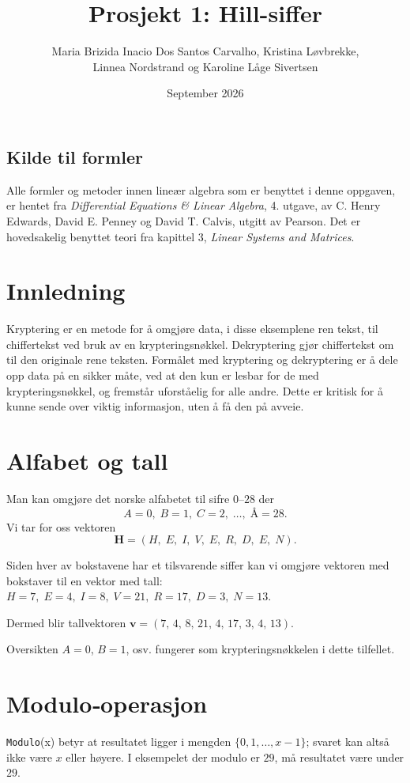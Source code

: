 \documentclass[12pt,a4paper]{article}
\title{Prosjekt 1: Hill-siffer}
\author{ Maria Brizida Inacio Dos Santos Carvalho, 
Kristina Løvbrekke, \\
Linnea Nordstrand og Karoline Låge Sivertsen }
\date{September 2026}
\begin{document}
 
\maketitle 
\tableofcontents 
\newpage


\subsection*{Kilde til formler} Alle formler og metoder innen lineær algebra som er benyttet i denne oppgaven, er hentet fra \textit{Differential Equations \& Linear Algebra}, 4. utgave, av C. Henry Edwards, David E. Penney og David T. Calvis, utgitt av Pearson. Det er hovedsakelig benyttet teori fra kapittel 3, \textit{Linear Systems and Matrices}.

\section{Innledning}
Kryptering er en metode for å omgjøre data, i disse eksemplene ren tekst,
til chiffertekst ved bruk av en krypteringsnøkkel. Dekryptering gjør
chiffertekst om til den originale rene teksten. Formålet med kryptering og
dekryptering er å dele opp data på en sikker måte, ved at den kun er lesbar
for de med krypteringsnøkkel, og fremstår uforståelig for alle andre.
Dette er kritisk for å kunne sende over viktig informasjon, uten å få den
på avveie.

\section{Alfabet og tall}
Man kan omgjøre det norske alfabetet til sifre $0$–$28$ der
\[ A=0,\; B=1,\; C=2,\;\dots,\; \text{Å}=28. \]
Vi tar for oss vektoren
\[ \mathbf{H}=(H,\;E,\;I,\;V,\;E,\;R,\;D,\;E,\;N). \]

Siden hver av bokstavene har et tilsvarende siffer kan vi omgjøre vektoren
med bokstaver til en vektor med tall:
$
H=7,\;E=4,\;I=8,\;V=21,\;R=17,\;D=3,\;N=13 .
$

Dermed blir tallvektoren
$
\mathbf{v} = (7,\,4,\,8,\,21,\,4,\,17,\,3,\,4,\,13).
$

\noindent Oversikten $A=0$, $B=1$, osv. fungerer som krypteringsnøkkelen i dette
tilfellet.

\section{Modulo‑operasjon}
\texttt{Modulo}(x) betyr at resultatet ligger i mengden $\{0,1,\dots ,x-1\}$;
svaret kan altså ikke være $x$ eller høyere. I eksempelet der modulo er $29$,
må resultatet være under $29$.
\end{document}
